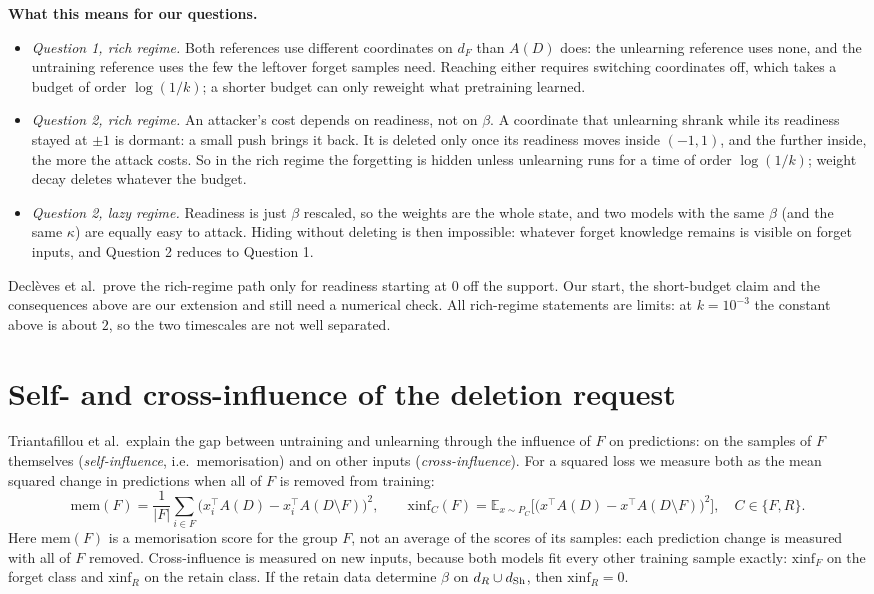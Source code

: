 \documentclass[10pt]{article}
\begin{document}
\textbf{What this means for our questions.}
\begin{itemize}\itemsep1pt
\item \emph{Question 1, rich regime.} Both references use different coordinates on $d_F$ than $A(D)$ does: the unlearning reference uses none, and the untraining reference uses the few the leftover forget samples need. Reaching either requires switching coordinates off, which takes a budget of order $\log(1/k)$; a shorter budget can only reweight what pretraining learned.
\item \emph{Question 2, rich regime.} An attacker's cost depends on readiness, not on $\beta$. A coordinate that unlearning shrank while its readiness stayed at $\pm1$ is dormant: a small push brings it back. It is deleted only once its readiness moves inside $(-1,1)$, and the further inside, the more the attack costs. So in the rich regime the forgetting is hidden unless unlearning runs for a time of order $\log(1/k)$; weight decay deletes whatever the budget.
\item \emph{Question 2, lazy regime.} Readiness is just $\beta$ rescaled, so the weights are the whole state, and two models with the same $\beta$ (and the same $\kappa$) are equally easy to attack. Hiding without deleting is then impossible: whatever forget knowledge remains is visible on forget inputs, and Question 2 reduces to Question 1.
\end{itemize}
Declèves et al.\ prove the rich-regime path only for readiness starting at $0$ off the support. Our start, the short-budget claim and the consequences above are our extension and still need a numerical check. All rich-regime statements are limits: at $k=10^{-3}$ the constant above is about $2$, so the two timescales are not well separated.

\section{Self- and cross-influence of the deletion request}
Triantafillou et al.\ explain the gap between untraining and unlearning through the influence of $F$ on predictions: on the samples of $F$ themselves (\emph{self-influence}, i.e.\ memorisation) and on other inputs (\emph{cross-influence}). For a squared loss we measure both as the mean squared change in predictions when all of $F$ is removed from training:
\[
\mathrm{mem}(F)=\frac{1}{|F|}\sum_{i\in F}\big(x_i^\top A(D)-x_i^\top A(D\setminus F)\big)^2,\qquad
\mathrm{xinf}_C(F)=\mathbb E_{x\sim P_C}\big[\big(x^\top A(D)-x^\top A(D\setminus F)\big)^2\big],\quad C\in\{F,R\}.
\]
Here $\mathrm{mem}(F)$ is a memorisation score for the group $F$, not an average of the scores of its samples: each prediction change is measured with all of $F$ removed. Cross-influence is measured on new inputs, because both models fit every other training sample exactly: $\mathrm{xinf}_F$ on the forget class and $\mathrm{xinf}_R$ on the retain class. If the retain data determine $\beta$ on $d_R\cup d_{\mathrm{Sh}}$, then $\mathrm{xinf}_R=0$.
\end{document}
